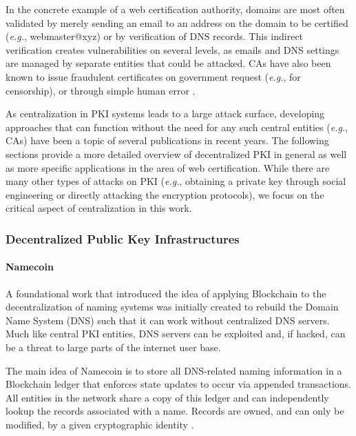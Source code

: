 In the concrete example of a web certification authority, domains are most often validated by merely sending an email to an address on the domain to be certified (\textit{e.g.}, webmaster@xyz) or by verification of DNS records. This indirect verification creates vulnerabilities on several levels, as emails and DNS settings are managed by separate entities that could be attacked. CAs have also been known to issue fraudulent certificates on government request (\textit{e.g.}, for censorship), or through simple human error \cite{zusman_criminal_2008, zohar_blockchain-based_2019}.

As centralization in PKI systems leads to a large attack surface, developing approaches that can function without the need for any such central entities (\textit{e.g.}, CAs) have been a topic of several publications in recent years. The following sections provide a more detailed overview of decentralized PKI in general as well as more specific applications in the area of web certification. While there are many other types of attacks on PKI (\textit{e.g.}, obtaining a private key through social engineering or directly attacking the encryption protocols), we focus on the critical aspect of centralization in this work.


\subsubsection{Decentralized Public Key Infrastructures}

\paragraph{Namecoin}

A foundational work that introduced the idea of applying Blockchain to the decentralization of naming systems was initially created to rebuild the Domain Name System (DNS) such that it can work without centralized DNS servers. Much like central PKI entities, DNS servers can be exploited and, if hacked, can be a threat to large parts of the internet user base.

The main idea of Namecoin is to store all DNS-related naming information in a Blockchain ledger that enforces state updates to occur via appended transactions. All entities in the network share a copy of this ledger and can independently lookup the records associated with a name. Records are owned, and can only be modified, by a given cryptographic identity \cite{noauthor_namecoin_nodate, ali_blockstack:_2016}.

